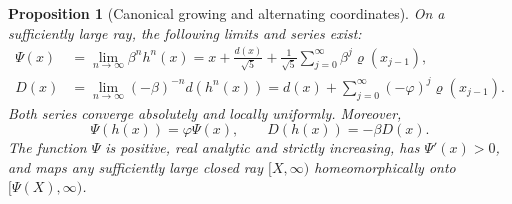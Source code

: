 \documentclass[11pt]{article}
\numberwithin{equation}{section}
\newtheorem{proposition}[theorem]{Proposition}
\theoremstyle{definition}
\theoremstyle{remark}
\begin{document}
\begin{proposition}[Canonical growing and alternating coordinates]
\label{gdy:dyn:prop:coordinates}
On a sufficiently large ray, the following limits and series exist:
\begin{align}
 \Psi(x)
 &=\lim_{n\to\infty}\beta^n h^n(x)
  =x+\frac{d(x)}{\sqrt5}
    +\frac1{\sqrt5}\sum_{j=0}^{\infty}
      \beta^j \varrho(x_{j-1}),\label{gdy:dyn:eq:Psi}\\
 D(x)
 &=\lim_{n\to\infty}(-\beta)^{-n}d(h^n(x))
  =d(x)+\sum_{j=0}^{\infty}(-\varphi)^j \varrho(x_{j-1}).
  \label{gdy:dyn:eq:D}
\end{align}
Both series converge absolutely and locally uniformly. Moreover,
\begin{equation}\label{gdy:dyn:eq:conjugacies}
 \Psi(h(x))=\varphi\Psi(x),\qquad D(h(x))=-\beta D(x).
\end{equation}
The function $\Psi$ is positive, real analytic and strictly increasing, has
$\Psi'(x)>0$, and maps any sufficiently large closed ray
$[X,\infty)$ homeomorphically onto $[\Psi(X),\infty)$.
\end{proposition}
\end{document}
